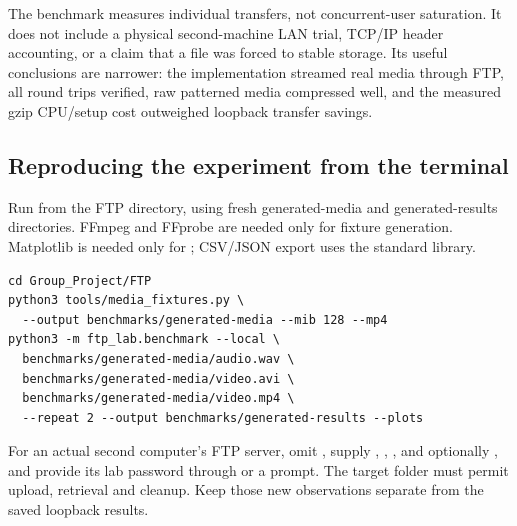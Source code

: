 The benchmark measures individual transfers, not concurrent-user saturation. It does not include a physical second-machine LAN trial, TCP/IP header accounting, or a claim that a file was forced to stable storage. Its useful conclusions are narrower: the implementation streamed real media through FTP, all round trips verified, raw patterned media compressed well, and the measured gzip CPU/setup cost outweighed loopback transfer savings.

\subsection{Reproducing the experiment from the terminal}
Run from the FTP directory, using fresh generated-media and generated-results directories. FFmpeg and FFprobe are needed only for fixture generation. Matplotlib is needed only for ; CSV/JSON export uses the standard library.
\begin{lstlisting}[style=ftpterm]
cd Group_Project/FTP
python3 tools/media_fixtures.py \
  --output benchmarks/generated-media --mib 128 --mp4
python3 -m ftp_lab.benchmark --local \
  benchmarks/generated-media/audio.wav \
  benchmarks/generated-media/video.avi \
  benchmarks/generated-media/video.mp4 \
  --repeat 2 --output benchmarks/generated-results --plots
\end{lstlisting}
For an actual second computer's FTP server, omit , supply , , , and optionally , and provide its lab password through  or a prompt. The target folder must permit upload, retrieval and cleanup. Keep those new observations separate from the saved loopback results.
